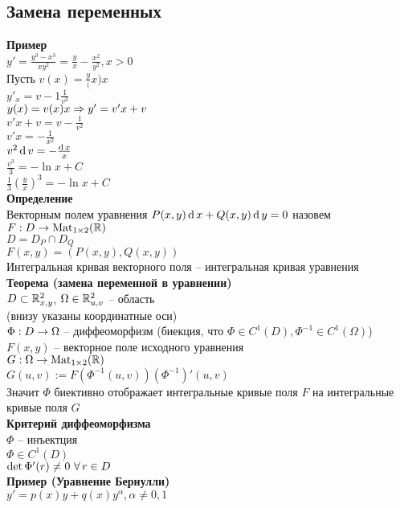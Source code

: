 \documentclass[12pt]{article}
\begin{document}
\subsection{Замена переменных}
\textbf{Пример}\\
$y' = \frac{y^3-x^3}{xy^2} = \frac yx - \frac{x^2}{y^2}, x > 0$\\
Пусть $v(x) = \frac y(x)x$\\
$y'_x = v - 1\frac 1{v^2}$\\
$y(x) = v(x)x \Rightarrow y' = v'x + v$\\
$v'x + v = v - \frac1{v^2}$\\
$v'x = -\frac1{x^2}$\\
$v^2 \operatorname{d} v = - \frac{\operatorname{d} x}x$\\
$\frac{v^3}3 = -\ln x + C$\\
$\frac13(\frac yx)^3 = -\ln x + C$\\
\textbf{Определение}\\
Векторным полем уравнения $P(x,y)\operatorname{d} x + Q(x,y) \operatorname{d} y = 0$ назовем $F: D \rightarrow \operatorname{Mat}_{1\times 2}(\mathbb{R})$\\
$D = D_P \cap D_Q$\\
$F(x, y) = (P(x,y), Q(x, y))$\\
Интегральная кривая векторного поля -- интегральная кривая уравнения\\
\textbf{Теорема (замена переменной в уравнении)}\\
$D \subset \mathbb{R}^2_{x, y}$, $\Omega \in \mathbb{R}^2_{u,v}$ -- область\\
(внизу указаны координатные оси)\\
$\Phi: D \rightarrow \Omega$ -- диффеоморфизм (биекция, что $\Phi \in C^1(D), \Phi^{-1} \in C^1(\Omega)$)\\
$F(x,y)$ -- векторное поле исходного уравнения\\
$G: \Omega \rightarrow \operatorname{Mat}_{1\times 2}(\mathbb{R})$\\
$G(u, v) := F(\Phi^{-1}(u,v))(\Phi^{-1})'(u, v)$\\
Значит $\Phi$ биективно отображает интегральные кривые поля $F$ на интегральные кривые поля $G$\\
\textbf{Критерий диффеоморфизма}\\
$\Phi$ -- инъектция\\
$\Phi \in C^1(D)$\\
$\det \Phi'(r) \neq 0\ \forall\, r \in D$\\
\textbf{Пример (Уравнение Бернулли)}\\
$y' = p(x)y + q(x)y^\alpha, \alpha \neq 0, 1$\\
\end{document}

